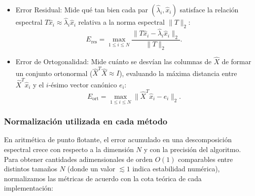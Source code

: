 \documentclass[11pt,a4paper]{article}
\begin{document}
\begin{itemize}
    \item Error Residual: Mide qué tan bien cada par $(\hat{\lambda}_i, \hat{x}_i)$ satisface la relación espectral $T \hat{x}_i \approx \hat{\lambda}_i \hat{x}_i$ relativa a la norma espectral $\|T\|_2$:
    $$E_{\text{res}} = \max_{1 \le i \le N} \frac{\|T \hat{x}_i - \hat{\lambda}_i \hat{x}_i\|_2}{\|T\|_2}.$$
    \item Error de Ortogonalidad: Mide cuánto se desvían las columnas de $\hat{X}$ de formar un conjunto ortonormal ($\hat{X}^T \hat{X} \approx I$), evaluando la máxima distancia entre $\hat{X}^T \hat{x}_i$ y el $i$-ésimo vector canónico $e_i$:
    $$E_{\text{ort}} = \max_{1 \le i \le N} \|\hat{X}^T \hat{x}_i - e_i\|_2.$$
\end{itemize}

\subsubsection*{Normalización utilizada en cada método}
En aritmética de punto flotante, el error acumulado en una descomposición espectral crece con respecto a la dimensión $N$ y con la precisión del algoritmo. Para obtener cantidades adimensionales de orden $O(1)$ comparables entre distintos tamaños $N$ (donde un valor $\lesssim 1$ indica estabilidad numérica), normalizamos las métricas de acuerdo con la cota teórica de cada implementación:
\end{document}
